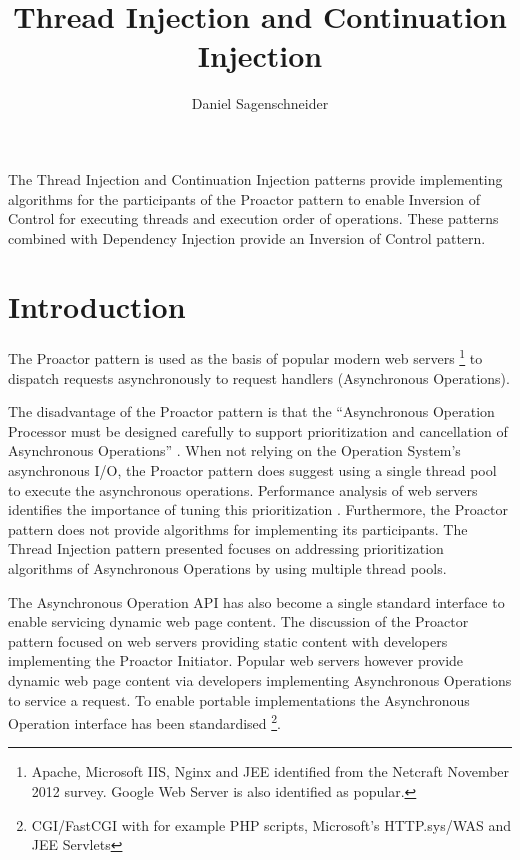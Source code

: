 \documentclass{article}
\begin{document}
\title{Thread Injection and Continuation Injection}
\author{Daniel Sagenschneider}
\date{}
\maketitle

\abstract{}
The Thread Injection and Continuation Injection patterns provide implementing
algorithms for the participants of the Proactor pattern to enable Inversion of
Control for executing threads and execution order of operations.  These patterns
combined with Dependency Injection provide an Inversion of Control pattern.

\section{Introduction}

The Proactor pattern \cite{proactor} is used as the basis of popular modern web
servers \footnote{Apache, Microsoft IIS, Nginx and JEE identified from the
Netcraft November 2012 survey.  Google Web Server is also identified as
popular.} to dispatch requests asynchronously to request handlers (Asynchronous
Operations).

The disadvantage of the Proactor pattern is that the ``Asynchronous Operation
Processor must be designed carefully to support prioritization and cancellation
of Asynchronous Operations'' \cite{proactor}.  When not relying on the Operation
System's asynchronous I/O, the Proactor pattern does suggest using a single
thread pool to execute the asynchronous operations.  Performance analysis of web
servers identifies the importance of tuning this prioritization
\cite{tuning-important,low-server-footprint,tuning-os-important}.  Furthermore,
the Proactor pattern does not provide algorithms for implementing its
participants.  The Thread Injection pattern presented focuses on addressing
prioritization algorithms of Asynchronous Operations by using multiple thread
pools.

The Asynchronous Operation API has also become a single standard interface to
enable servicing dynamic web page content.  The discussion of the Proactor
pattern focused on web servers providing static content with developers
implementing the Proactor Initiator.  Popular web servers however provide
dynamic web page content via developers implementing Asynchronous Operations to
service a request.  To enable portable implementations the Asynchronous
Operation interface has been standardised \footnote{CGI/FastCGI with for
example PHP scripts, Microsoft's HTTP.sys/WAS and JEE Servlets}.
\end{document}
